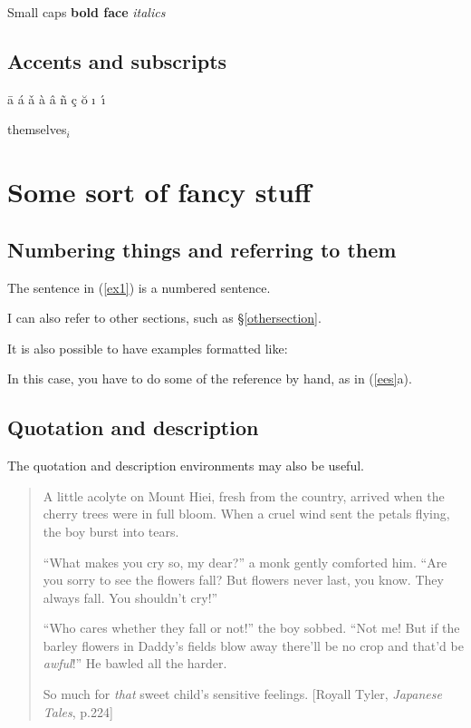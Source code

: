 {\sc Small caps} {\bf bold face} {\em italics}

\subsection{Accents and subscripts}

\={a} \'{a} \v{a} \`{a} \^{a} \~{n} \c{c} \u{o} \i\ \'{\i}

\noindent
themselves$_{i}$

\section{Some sort of fancy stuff}

\subsection{Numbering things and referring to them}

The sentence in (\ref{ex1}) is a numbered sentence.

I can also refer to other sections, such as \S\ref{othersection}.

It is also possible to have examples formatted like:

In this case, you have to do some of the reference by hand, as 
in (\ref{ees}a).

\subsection{Quotation and description}

The quotation and description environments may also be useful.

\begin{quotation}
A little acolyte on Mount Hiei, fresh from the country, arrived when
the cherry trees were in full bloom.  When a cruel wind sent the petals
flying, the boy burst into tears.

``What makes you cry so, my dear?'' a monk gently comforted him.
``Are you sorry to see the flowers fall? But flowers never last, you
know.  They always fall.  You shouldn't cry!''

``Who cares whether they fall or not!'' the boy sobbed.  ``Not me!
But if the barley flowers in Daddy's fields blow away there'll be
no crop and that'd be {\em awful}!''  He bawled all the harder.

So much for {\em that} sweet child's sensitive feelings. [Royall Tyler,
{\em Japanese Tales}, p.224]
\end{quotation}

